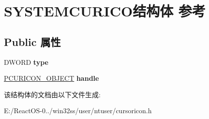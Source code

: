 \hypertarget{struct_s_y_s_t_e_m_c_u_r_i_c_o}{}\section{S\+Y\+S\+T\+E\+M\+C\+U\+R\+I\+C\+O结构体 参考}
\label{struct_s_y_s_t_e_m_c_u_r_i_c_o}
\subsection*{Public 属性}
\begin{DoxyCompactItemize}
\item 
\mbox{\label{struct_s_y_s_t_e_m_c_u_r_i_c_o_abab0d8fe36615a38f2c3a488d8350319}} 
D\+W\+O\+RD {\bfseries type}
\item 
\mbox{\label{struct_s_y_s_t_e_m_c_u_r_i_c_o_af4554e5d19c61f0b95413a2d4dc093ac}} 
\hyperlink{struct___c_u_r_i_c_o_n___o_b_j_e_c_t}{P\+C\+U\+R\+I\+C\+O\+N\+\_\+\+O\+B\+J\+E\+CT} {\bfseries handle}
\end{DoxyCompactItemize}


该结构体的文档由以下文件生成\+:\begin{DoxyCompactItemize}
\item 
E\+:/\+React\+O\+S-\/0../win32ss/user/ntuser/cursoricon.\+h\end{DoxyCompactItemize}
